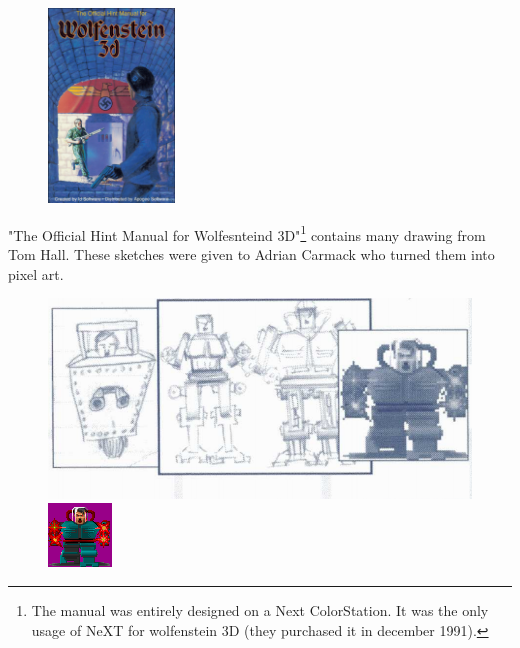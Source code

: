 \documentclass[book.tex]{subfiles}
\begin{document}
\begin{figure}[H]
\centering
      \includegraphics[width=0.3\textwidth]{imgs/hint_manual_cover.png}    
\end{figure}
"The Official Hint Manual for Wolfesnteind 3D"\footnote{The manual was entirely designed on a Next ColorStation. It was the only usage of NeXT for wolfenstein 3D (they purchased it in december 1991).} contains many drawing from Tom Hall. These sketches were given to Adrian Carmack who turned them into pixel art.\\

  \begin{figure}[H]
\centering
 \includegraphics[scale=0.5]{imgs/tom_hall_sketch_adolf.png}
  \includegraphics[scale=5]{imgs/sprites/adolf.png}
 \end{figure}
 
\end{document}
